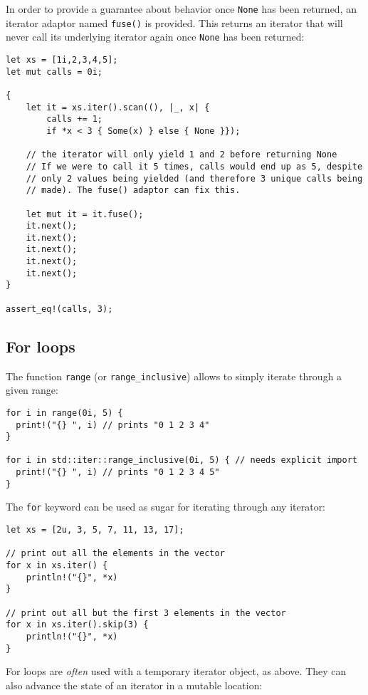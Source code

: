 \documentclass[]{article}
\begin{document}
In order to provide a guarantee about behavior once \texttt{None} has
been returned, an iterator adaptor named \texttt{fuse()} is provided.
This returns an iterator that will never call its underlying iterator
again once \texttt{None} has been returned:

\begin{verbatim}
let xs = [1i,2,3,4,5];
let mut calls = 0i;

{
    let it = xs.iter().scan((), |_, x| {
        calls += 1;
        if *x < 3 { Some(x) } else { None }});

    // the iterator will only yield 1 and 2 before returning None
    // If we were to call it 5 times, calls would end up as 5, despite
    // only 2 values being yielded (and therefore 3 unique calls being
    // made). The fuse() adaptor can fix this.

    let mut it = it.fuse();
    it.next();
    it.next();
    it.next();
    it.next();
    it.next();
}

assert_eq!(calls, 3);
\end{verbatim}

\subsection{For loops}\label{for-loops}

The function \texttt{range} (or \texttt{range\_inclusive}) allows to
simply iterate through a given range:

\begin{verbatim}
for i in range(0i, 5) {
  print!("{} ", i) // prints "0 1 2 3 4"
}

for i in std::iter::range_inclusive(0i, 5) { // needs explicit import
  print!("{} ", i) // prints "0 1 2 3 4 5"
}
\end{verbatim}

The \texttt{for} keyword can be used as sugar for iterating through any
iterator:

\begin{verbatim}
let xs = [2u, 3, 5, 7, 11, 13, 17];

// print out all the elements in the vector
for x in xs.iter() {
    println!("{}", *x)
}

// print out all but the first 3 elements in the vector
for x in xs.iter().skip(3) {
    println!("{}", *x)
}
\end{verbatim}

For loops are \emph{often} used with a temporary iterator object, as
above. They can also advance the state of an iterator in a mutable
location:
\end{document}
